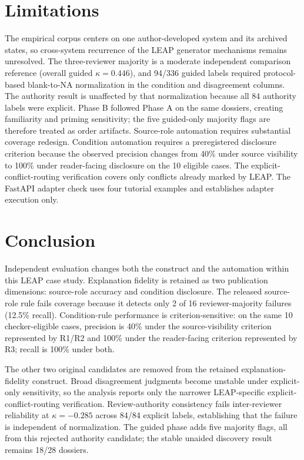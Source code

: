 \documentclass[a4paper,fleqn]{cas-dc}
\begin{document}
\section{Limitations}
The empirical corpus centers on one author-developed system and its archived states, so cross-system recurrence of the LEAP generator mechanisms remains unresolved. The three-reviewer majority is a moderate independent comparison reference (overall guided $\kappa=0.446$), and 94/336 guided labels required protocol-based blank-to-NA normalization in the condition and disagreement columns. The authority result is unaffected by that normalization because all 84 authority labels were explicit. Phase B followed Phase A on the same dossiers, creating familiarity and priming sensitivity; the five guided-only majority flags are therefore treated as order artifacts. Source-role automation requires substantial coverage redesign. Condition automation requires a preregistered disclosure criterion because the observed precision changes from 40\% under source visibility to 100\% under reader-facing disclosure on the 10 eligible cases. The explicit-conflict-routing verification covers only conflicts already marked by LEAP. The FastAPI adapter check uses four tutorial examples and establishes adapter execution only.

\section{Conclusion}
Independent evaluation changes both the construct and the automation within this LEAP case study. Explanation fidelity is retained as two publication dimensions: source-role accuracy and condition disclosure. The released source-role rule fails coverage because it detects only 2 of 16 reviewer-majority failures (12.5\% recall). Condition-rule performance is criterion-sensitive: on the same 10 checker-eligible cases, precision is 40\% under the source-visibility criterion represented by R1/R2 and 100\% under the reader-facing criterion represented by R3; recall is 100\% under both.

The other two original candidates are removed from the retained explanation-fidelity construct. Broad disagreement judgments become unstable under explicit-only sensitivity, so the analysis reports only the narrower LEAP-specific explicit-conflict-routing verification. Review-authority consistency fails inter-reviewer reliability at $\kappa=-0.285$ across 84/84 explicit labels, establishing that the failure is independent of normalization. The guided phase adds five majority flags, all from this rejected authority candidate; the stable unaided discovery result remains 18/28 dossiers.
\end{document}

